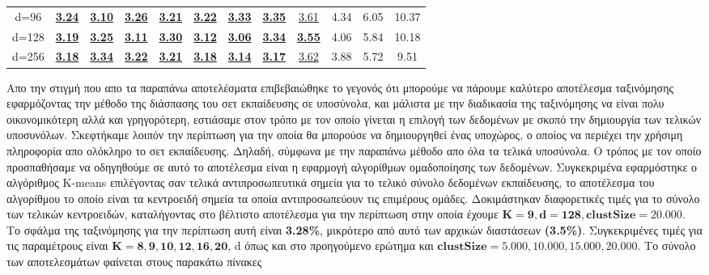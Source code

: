 \begin{table}[H]
\begin{tabular}{|c|c|c|c|c|c|c|c|c|c|c|c|}
d=96 & \underline{\textbf{3.24}} & \underline{\textbf{3.10}} & \underline{\textbf{3.26}} & \underline{\textbf{3.21}} & \underline{\textbf{3.22}} & \underline{\textbf{3.33}} & \underline{\textbf{3.35}} & \underline{3.61} & 4.34 & 6.05 & 10.37 \\
d=128 & \underline{\textbf{3.19}} & \underline{\textbf{3.25}} & \underline{\textbf{3.11}} & \underline{\textbf{3.30}} & \underline{\textbf{3.12}} & \underline{\textbf{3.06}} & \underline{\textbf{3.34}} & \underline{\textbf{3.55}} & 4.06 & 5.84 & 10.18 \\
d=256 & \underline{\textbf{3.18}} & \underline{\textbf{3.34}} & \underline{\textbf{3.22}} & \underline{\textbf{3.21}} & \underline{\textbf{3.18}} & \underline{\textbf{3.14}} & \underline{\textbf{3.17}} & \underline{3.62} & 3.88 & 5.72 & 9.51 \\
\hline
\end{tabular}
\end{table}

\par
Απο την στιγμή που απο τα παραπάνω αποτελέσματα επιβεβαιώθηκε το γεγονός ότι μπορούμε να πάρουμε καλύτερο αποτέλεσμα ταξινόμησης εφαρμόζοντας την μέθοδο της διάσπασης του σετ εκπαίδευσης σε υποσύνολα, και μάλιστα με την διαδικασία της ταξινόμησης να είναι πολυ οικονομικότερη αλλά και γρηγορότερη, εστιάσαμε στον τρόπο με τον οποίο γίνεται η επιλογή των δεδομένων με σκοπό την δημιουργία των τελικών υποσυνόλων. Σκεφτήκαμε λοιπόν την περίπτωση για την οποία θα μπορούσε να δημιουργηθεί ένας υποχώρος, ο οποίος να περιέχει την χρήσιμη πληροφορία απο ολόκληρο το σετ εκπαίδευσης. Δηλαδή, σύμφωνα με την παραπάνω μέθοδο απο όλα τα τελικά υποσύνολα. Ο τρόπος με τον οποίο προσπαθήσαμε να οδηγηθούμε σε αυτό το αποτέλεσμα είναι η εφαρμογή αλγορίθμων ομαδοποίησης των δεδομένων. Συγκεκριμένα εφαρμόστηκε ο αλγόριθμος \textlatin{K-means}\textlatin{\cite{kmeans}} επιλέγοντας σαν τελικά αντιπροσωπευτικά σημεία για το τελικό σύνολο δεδομένων εκπαίδευσης, το αποτέλεσμα του αλγορίθμου το οποίο είναι τα κεντροειδή σημεία τα οποία αντιπροσωπεύουν τις επιμέρους ομάδες. Δοκιμάστηκαν διαφορετικές τιμές για το σύνολο των τελικών κεντροειδών, καταλήγοντας στο βέλτιστο αποτέλεσμα για την περίπτωση στην οποία έχουμε $\mathbf{K=9, d=128, clustSize=20.000}$. Το σφάλμα της ταξινόμησης για την περίπτωση αυτή είναι \textbf{3.28\%}, μικρότερο από αυτό των αρχικών διαστάσεων \textbf{(3.5\%)}. Συγκεκριμένες τιμές για τις παραμέτρους είναι $\mathbf{K=8,9,10,12,16,20}$, \textlatin{d} όπως και στο προηγούμενο ερώτημα και $\mathbf{clustSize=5.000, 10.000, 15.000, 20.000}$. Το σύνολο των αποτελεσμάτων φαίνεται στους παρακάτω πίνακες

